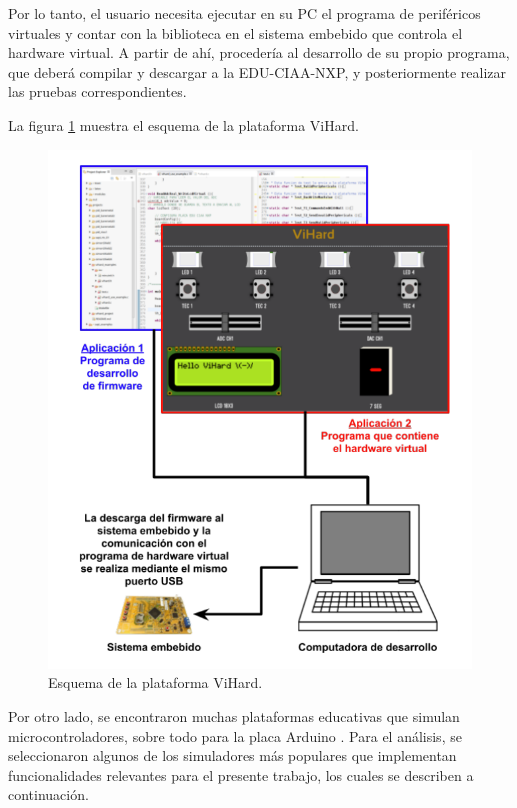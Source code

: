 Por lo tanto, el usuario necesita ejecutar en su PC el programa de periféricos virtuales y contar con la biblioteca en el sistema embebido que controla el hardware virtual. A partir de ahí, procedería al desarrollo de su propio programa, que deberá compilar y descargar a la EDU-CIAA-NXP, y posteriormente realizar las pruebas correspondientes.


La figura \ref{fig:ViHard} muestra el esquema de la plataforma ViHard.

\begin{figure}[ht]
	\centering
	\includegraphics[scale=.40]{./Figures/ViHard.png}
	\caption{Esquema de la plataforma ViHard.\protect\footnotemark}
	\label{fig:ViHard}
\end{figure}


Por otro lado, se encontraron muchas plataformas educativas que simulan microcontroladores, sobre todo para la placa Arduino \citep{Arduino}. Para el análisis, se seleccionaron algunos de los simuladores más populares que implementan funcionalidades relevantes para el presente trabajo, los cuales se describen a continuación. 

